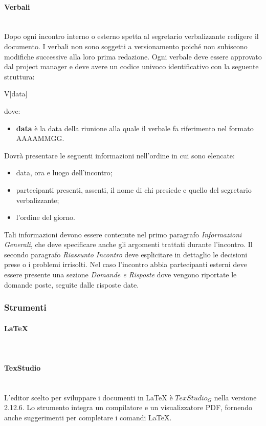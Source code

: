 		\paragraph{Verbali}\mbox{} \\
		Dopo ogni incontro interno o esterno spetta al segretario verbalizzante redigere il documento. I verbali non sono soggetti a versionamento poiché non subiscono modifiche successive alla loro prima redazione. 
		Ogni verbale deve essere approvato dal project manager e deve avere un codice univoco identificativo con la seguente struttura: 
		\newline
		\centerline{V[data]} 
		dove: 
    \begin{itemize} 
\item \textbf{data} è la data della riunione alla quale il verbale fa riferimento nel formato AAAAMMGG. 
\end{itemize}
Dovrà presentare le seguenti informazioni nell'ordine in cui sono elencate:
\begin{itemize}
\item data, ora e luogo dell'incontro;
\item partecipanti presenti, assenti, il nome di chi presiede e quello del segretario verbalizzante;
\item l'ordine del giorno.
\end{itemize}
Tali informazioni devono essere contenute nel primo paragrafo \textit{Informazioni Generali}, che deve specificare anche gli argomenti trattati durante l'incontro.
Il secondo paragrafo \textit{Riassunto Incontro} deve esplicitare in dettaglio le decisioni prese o i problemi irrisolti.
Nel caso l'incontro abbia partecipanti esterni deve essere presente una sezione  \textit{Domande e Risposte} dove vengono riportate le domande poste, seguite dalle risposte date.
	\subsubsection{Strumenti}
		\paragraph{\LaTeX}\mbox{} \\
		
		\paragraph{TexStudio}\mbox{} \\
		L'editor scelto per sviluppare i documenti in \LaTeX\text{ } è\text{ } $TexStudio_G$ nella versione 2.12.6. 
		Lo strumento integra un compilatore e un visualizzatore PDF, fornendo anche suggerimenti per completare i comandi \LaTeX.
		
